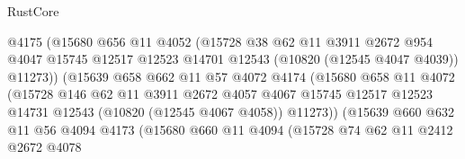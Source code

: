 \begin{lexlean}{RustCore}
\begin{coremodule}
                              @4175
                              (@15680
                                @656
                                @11
                                @4052
                                (@15728
                                  @38
                                  @62
                                  @11
                                  @3911
                                  @2672
                                  @954
                                  @4047
                                  @15745
                                  @12517
                                  @12523
                                  @14701
                                  @12543
                                  (@10820 (@12545 @4047 @4039))
                                  @11273))
                              (@15639
                                @658
                                @662
                                @11
                                @57
                                @4072
                                @4174
                                (@15680
                                  @658
                                  @11
                                  @4072
                                  (@15728
                                    @146
                                    @62
                                    @11
                                    @3911
                                    @2672
                                    @4057
                                    @4067
                                    @15745
                                    @12517
                                    @12523
                                    @14731
                                    @12543
                                    (@10820 (@12545 @4067 @4058))
                                    @11273))
                                (@15639
                                  @660
                                  @632
                                  @11
                                  @56
                                  @4094
                                  @4173
                                  (@15680
                                    @660
                                    @11
                                    @4094
                                    (@15728
                                      @74
                                      @62
                                      @11
                                      @2412
                                      @2672
                                      @4078

\end{coremodule}
\end{lexlean}
